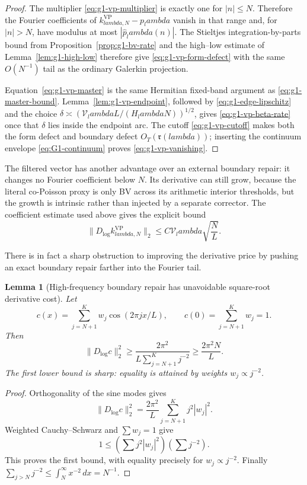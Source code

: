 \documentclass[11pt]{article}
\def\lambda{lambda}%
\newtheorem{lemma}[theorem]{Lemma}
\theoremstyle{remark}
\begin{document}
\begin{proof}
The multiplier \eqref{eq:g1-vp-multiplier} is exactly one for $|n|\le N$.
Therefore the Fourier coefficients of
$k^{\mathrm{VP}}_{\lambda,N}-p_\lambda$ vanish in that range and, for
$|n|>N$, have modulus at most $|\widehat p_\lambda(n)|$.  The Stieltjes
integration-by-parts bound from Proposition~\ref{prop:g1-bv-rate} and the
high--low estimate of Lemma~\ref{lem:g1-high-low} therefore give
\eqref{eq:g1-vp-form-defect} with the same $O(N^{-1})$ tail as the ordinary
Galerkin projection.

Equation~\eqref{eq:g1-vp-master} is the same Hermitian fixed-band argument as
\eqref{eq:g1-master-bound}.  Lemma~\ref{lem:g1-vp-endpoint}, followed by
\eqref{eq:g1-edge-lipschitz} and the choice
$\delta\asymp(\mathcal V_\lambda L/(H_\lambda N))^{1/2}$, gives
\eqref{eq:g1-vp-beta-rate} once that $\delta$ lies inside the endpoint arc.
The cutoff \eqref{eq:g1-vp-cutoff} makes both the form defect and boundary
defect $O_T(\mathfrak r(\lambda))$; inserting the continuum envelope
\eqref{eq:G1-continuum} proves \eqref{eq:g1-vp-vanishing}.
\end{proof}

The filtered vector has another advantage over an external boundary repair:
it changes no Fourier coefficient below $N$.  Its derivative can still grow,
because the literal co-Poisson proxy is only BV across its arithmetic interior
thresholds, but the growth is intrinsic rather than injected by a separate
corrector.  The coefficient estimate used above gives the explicit bound
\begin{equation}\label{eq:g1-vp-derivative}
 \|D_{\log}k^{\mathrm{VP}}_{\lambda,N}\|_2
 \le C\mathcal V_\lambda\sqrt{\frac{N}{L}}.
\end{equation}

There is in fact a sharp obstruction to improving the derivative price by
pushing an exact boundary repair farther into the Fourier tail.

\begin{lemma}[High-frequency boundary repair has unavoidable square-root derivative cost]\label{lem:g1-repair-no-go}
Let
\[
 c(x)=\sum_{j=N+1}^{K}w_j\cos(2\pi jx/L),
 \qquad c(0)=\sum_{j=N+1}^{K}w_j=1.
\]
Then
\begin{equation}\label{eq:g1-repair-no-go}
 \boxed{
 \|D_{\log}c\|_2^2
 \ge
 \frac{2\pi^2}{L\displaystyle\sum_{j=N+1}^{K}j^{-2}}
 \ge\frac{2\pi^2N}{L}.}
\end{equation}
The first lower bound is sharp: equality is attained by weights
$w_j\propto j^{-2}$.
\end{lemma}
\begin{proof}
Orthogonality of the sine modes gives
\[
 \|D_{\log}c\|_2^2
 =\frac{2\pi^2}{L}\sum_{j=N+1}^{K}j^2|w_j|^2.
\]
Weighted Cauchy--Schwarz and $\sum w_j=1$ give
\[
 1\le
 \left(\sum j^2|w_j|^2\right)
 \left(\sum j^{-2}\right).
\]
This proves the first bound, with equality precisely for $w_j\propto j^{-2}$.
Finally
$\sum_{j>N}j^{-2}\le\int_N^\infty x^{-2}\,dx=N^{-1}$.
\end{proof}
\end{document}
